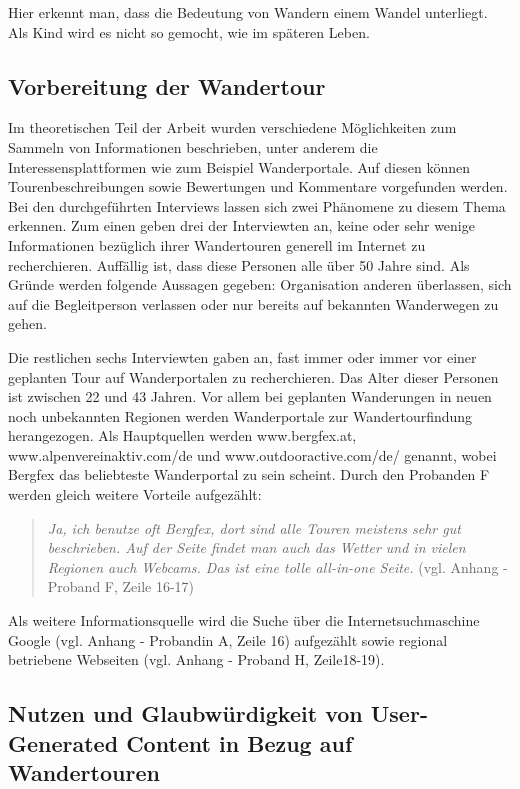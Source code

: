 Hier erkennt man, dass die Bedeutung von Wandern einem Wandel unterliegt. Als Kind wird es nicht so gemocht, wie im späteren Leben.

\subsection{Vorbereitung der Wandertour}

Im theoretischen Teil der Arbeit wurden verschiedene Möglichkeiten zum Sammeln von Informationen beschrieben, unter anderem die Interessensplattformen wie zum Beispiel Wanderportale. Auf diesen können Tourenbeschreibungen sowie Bewertungen und Kommentare vorgefunden werden. Bei den durchgeführten Interviews lassen sich zwei Phänomene zu diesem Thema erkennen. Zum einen geben drei der Interviewten an, keine oder sehr wenige Informationen bezüglich ihrer Wandertouren generell im Internet zu recherchieren. Auffällig ist, dass diese Personen alle über 50 Jahre sind. Als Gründe werden folgende Aussagen gegeben: Organisation anderen überlassen, sich auf die Begleitperson verlassen oder nur bereits auf bekannten Wanderwegen zu gehen.

Die restlichen sechs Interviewten gaben an, fast immer oder immer vor einer geplanten Tour auf Wanderportalen zu recherchieren. Das Alter dieser Personen ist zwischen 22 und 43 Jahren. Vor allem bei geplanten Wanderungen in neuen noch unbekannten Regionen werden Wanderportale zur Wandertourfindung herangezogen. Als Hauptquellen werden www.bergfex.at, www.alpenvereinaktiv.com/de und www.outdooractive.com/de/ genannt, wobei Bergfex das beliebteste Wanderportal zu sein scheint. 
Durch den Probanden F werden gleich weitere Vorteile aufgezählt:

\begin{quote}
	\textit{\glqq Ja, ich benutze oft Bergfex, dort sind alle Touren meistens sehr gut beschrieben. Auf der Seite findet man auch das Wetter und in vielen Regionen auch Webcams. Das ist eine tolle all-in-one Seite.\grqq} (vgl. Anhang - Proband F, Zeile 16-17)
\end{quote}

Als weitere Informationsquelle wird die Suche über die Internetsuchmaschine Google (vgl. Anhang - Probandin A, Zeile 16) aufgezählt sowie regional betriebene Webseiten (vgl. Anhang - Proband H, Zeile18-19). 

\subsection{Nutzen und Glaubwürdigkeit von User-Generated Content in Bezug auf Wandertouren}


